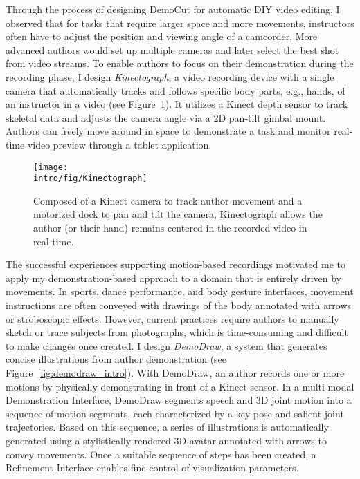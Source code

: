 Through the process of designing DemoCut for automatic DIY video editing, I observed that for tasks that require larger space and more movements, instructors often have to adjust the position and viewing angle of a camcorder. More advanced authors would set up multiple cameras and later select the best shot from video streams.
%
To enable authors to focus on their demonstration during the recording phase, I design \emph{Kinectograph}, a video recording device with a single camera that automatically tracks and follows specific body parts, e.g., hands, of an instructor in a video (see Figure~\ref{fig:kinectograph_intro}). It utilizes a Kinect depth sensor to track skeletal data and adjusts the camera angle via a 2D pan-tilt gimbal mount. Authors can freely move around in space to demonstrate a task and monitor real-time video preview through a tablet application.

\begin{figure}[!t]
  \centering
  \texttt{[image: \\intro/fig/Kinectograph]}
  \caption{Composed of a Kinect camera to track author movement and a motorized dock to pan and tilt the camera, Kinectograph allows the author (or their hand) remains centered in the recorded video in real-time.}
\label{fig:kinectograph_intro}
\end{figure}


The successful experiences supporting motion-based recordings motivated me to apply my demonstration-based approach to a domain that is entirely driven by movements. In sports, dance performance, and body gesture interfaces, movement instructions are often conveyed with drawings of the body annotated with arrows or stroboscopic effects. However, current practices require authors to manually sketch or trace subjects from photographs, which is time-consuming and difficult to make changes once created.
%
I design \emph{DemoDraw}, a system that generates concise illustrations from author demonstration (see Figure~\ref{fig:demodraw_intro}). With DemoDraw, an author records one or more motions by physically demonstrating in front of a Kinect sensor. In a multi-modal Demonstration Interface, DemoDraw segments speech and 3D joint motion into a sequence of motion segments, each characterized by a key pose and salient joint trajectories. Based on this sequence, a series of illustrations is automatically generated using a stylistically rendered 3D avatar annotated with arrows to convey movements. Once a suitable sequence of steps has been created, a Refinement Interface enables fine control of visualization parameters.

